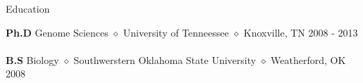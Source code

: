 \documentclass{resume} %
\begin{document}

\begin{rSection}{Education}

{\bf Ph.D} Genome Sciences {$\diamond$} University of Tenneessee {$\diamond$} Knoxville, TN \hfill {2008 - 2013} 
\\
\\
{\bf B.S}  Biology {$\diamond$} Southwerstern Oklahoma State University {$\diamond$}  Weatherford, OK \hfill{2008}
\end{rSection}

\end{document}
